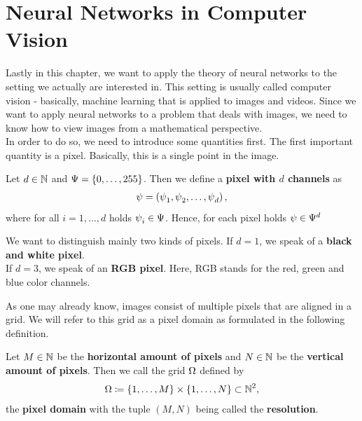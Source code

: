\section{Neural Networks in Computer Vision}

Lastly in this chapter, we want to apply the theory of neural networks to the setting we actually are interested in. This setting is usually called computer vision - basically, machine learning that is applied to images and videos. Since we want to apply neural networks to a problem that deals with images, we need to know how to view images from a mathematical perspective.\\
In order to do so, we need to introduce some quantities first. The first important quantity is a pixel. Basically, this is a single point in the image.


\begin{definition}\label{def:pixel}
Let $d\in\N$ and $\P=\{0,\ldots,255\}$. Then we define a \textbf{pixel with $d$ channels} as
\begin{align*}
\p = \left(\p_1, \p_2,\ldots, \p_d\right),
\end{align*}
where for all $i=1,\ldots,d$ holds $\p_i\in\P$. Hence, for each pixel holds $\p\in\P^d$
\end{definition}


\begin{remark}
We want to distinguish mainly two kinds of pixels. If $d=1$, we speak of a \textbf{black and white pixel}.\\
If $d=3$, we speak of an \textbf{RGB pixel}. Here, RGB stands for the  red, green and blue color channels.
\end{remark}


As one may already know, images consist of multiple pixels that are aligned in a grid. We will refer to this grid as a pixel domain as formulated in the following definition.


\begin{definition}\label{def:pixel_domain}
Let $M\in\N$ be the \textbf{horizontal amount of pixels} and $N\in\N$ be the \textbf{vertical amount of pixels}. Then we call the grid $\O$ defined by
\begin{align*}
\O \coloneqq \left\{1, \ldots, M\right\} \times \left\{1,\ldots, N\right\} \subset \N^2,
\end{align*}
the \textbf{pixel domain} with the tuple $(M,N)$ being called the \textbf{resolution}.
\end{definition}


